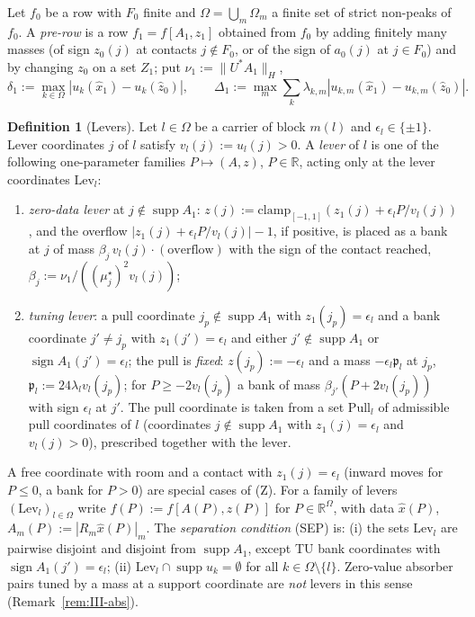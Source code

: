 \documentclass[10pt]{amsart}
\theoremstyle{definition}
\newtheorem{definition}[theorem]{Definition}
\theoremstyle{remark}
\newcommand{\supp}{\operatorname{supp}}
\newcommand{\sgn}{\operatorname{sign}}
\newcommand{\R}{\mathbb R}
\newcommand{\zh}{\hat z}
\begin{document}
Let $f_0$ be a row with $F_0$ finite and $\Omega=\bigcup_m\Omega_m$ a finite set
of strict non-peaks of $f_0$.  A \emph{pre-row} is a row $f_1=f[A_1,z_1]$
obtained from $f_0$ by adding finitely many masses (of sign $z_0(j)$ at
contacts $j\notin F_0$, or of the sign of $a_0(j)$ at $j\in F_0$) and by
changing $z_0$ on a set $Z_1$; put $\nu_1:=\|U^*A_1\|_H$,
\[
 \delta_1:=\max_{k\in\Omega}|u_k(\hat x_1)-u_k(\zh_0)|,\qquad
 \Delta_1:=\max_m\sum_k\lambda_{k,m}|u_{k,m}(\hat x_1)-u_{k,m}(\zh_0)| .
\]

\begin{definition}[Levers]\label{def:III-levers}
Let $l\in\Omega$ be a carrier of block $m(l)$ and $\epsilon_l\in\{\pm1\}$.
Lever coordinates $j$ of $l$ satisfy $v_l(j):=u_l(j)>0$.  A \emph{lever} of $l$
is one of the following one-parameter families $P\mapsto(A,z)$, $P\in\R$,
acting only at the lever coordinates $\mathrm{Lev}_l$:
\begin{enumerate}
\item[(Z)] \emph{zero-data lever} at $j\notin\supp A_1$: $z(j):=\mathrm{clamp}_{
[-1,1]}(z_1(j)+\epsilon_lP/v_l(j))$, and the overflow
$|z_1(j)+\epsilon_lP/v_l(j)|-1$, if positive, is placed as a bank at $j$ of mass
$\beta_j\,v_l(j)\cdot(\text{overflow})$ with the sign of the contact reached,
$\beta_j:=\nu_1/((\mu^\star_j)^2v_l(j))$;
\item[(TU)] \emph{tuning lever}: a pull coordinate $j_p\notin\supp A_1$ with
$z_1(j_p)=\epsilon_l$ and a bank coordinate $j'\ne j_p$ with $z_1(j')=
\epsilon_l$ and either $j'\notin\supp A_1$ or $\sgn A_1(j')=\epsilon_l$; the
pull is \emph{fixed}: $z(j_p):=-\epsilon_l$ and a mass $-\epsilon_l\mathfrak p_l$
at $j_p$, $\mathfrak p_l:=24\lambda_lv_l(j_p)$; for $P\ge-2v_l(j_p)$ a bank of
mass $\beta_{j'}(P+2v_l(j_p))$ with sign $\epsilon_l$ at $j'$.  The pull
coordinate is taken from a set $\mathrm{Pull}_l$ of admissible pull
coordinates of $l$ (coordinates $j\notin\supp A_1$ with $z_1(j)=\epsilon_l$
and $v_l(j)>0$), prescribed together with the lever.
\end{enumerate}
A free coordinate with room and a contact with $z_1(j)=\epsilon_l$ (inward
moves for $P\le0$, a bank for $P>0$) are special cases of (Z).  For a family of
levers $(\mathrm{Lev}_l)_{l\in\Omega}$ write $f(P):=f[A(P),z(P)]$ for
$P\in\R^\Omega$, with data $\hat x(P)$, $A_m(P):=|R_m\hat x(P)|_m$.  The
\emph{separation condition} \textup{(SEP)} is: (i) the sets $\mathrm{Lev}_l$ are
pairwise disjoint and disjoint from $\supp A_1$, except TU bank coordinates
with $\sgn A_1(j')=\epsilon_l$; (ii) $\mathrm{Lev}_l\cap\supp u_k=\emptyset$ for
all $k\in\Omega\setminus\{l\}$.  Zero-value absorber pairs tuned by a mass at a
support coordinate are \emph{not} levers in this sense (Remark~\ref{rem:III-abs}).
\end{definition}
\end{document}
